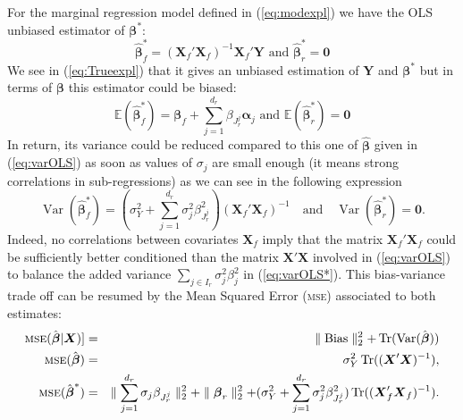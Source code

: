 \documentclass[12pt,a4paper]{report}
\begin{document}
For the marginal regression model defined in (\ref{eq:modexpl})
we have the \textsc{OLS} unbiased estimator of $\boldsymbol{\beta}^*$: 
		\begin{equation}
			\hat{\boldsymbol{\beta}}_{f}^* = (\boldsymbol{X}_{f}'\boldsymbol{X}_{f})^{-1}\boldsymbol{X}_{f}'\boldsymbol{Y}  \textrm{ and }\boldsymbol{\hat\beta}_{r}^* = \boldsymbol{0}
		\end{equation}
		We see in (\ref{eq:Trueexpl}) that it gives an unbiased estimation of $\boldsymbol{Y}$ and $\boldsymbol{\beta^*}$
		but in terms of $\boldsymbol{\beta}$ this estimator could be biased:
		\begin{equation}
			\mathbb{E}(\hat{\boldsymbol{\beta}}_{f}^*)=\boldsymbol{\beta}_{f}+\sum_{j =1}^{d_r}\beta_{J_r^j}\boldsymbol{\alpha}_j \textrm{ and }\mathbb{E}(\hat{\boldsymbol{\beta}}_{r}^*)=\boldsymbol{0}
		\end{equation}
		In return, its variance could be reduced compared to this one of $\hat{\boldsymbol{\beta}}$ given in (\ref{eq:varOLS}) as soon as values of $\sigma_j$ are small enough (it means strong correlations in sub-regressions) as we can see in the following expression
		\begin{equation}
			\operatorname{Var}(\hat{\boldsymbol{\beta}}_f^*)= (\sigma^2_Y+\sum_{j =1}^{d_r}\sigma^2_{j}\beta_{J_r^j}^2)(\boldsymbol{X}_f' \boldsymbol{X}_f)^{-1} \quad \textrm{and} \quad\operatorname{Var}(\hat{\boldsymbol{\beta}}_r^*)= \boldsymbol{0}. \label{eq:varOLS*}
		\end{equation}
Indeed, no correlations between covariates $\boldsymbol{X}_f$ imply that the matrix $\boldsymbol{X}_f' \boldsymbol{X}_f$ could be sufficiently better conditioned than the matrix $\boldsymbol{X}' \boldsymbol{X}$ involved in (\ref{eq:varOLS}) to balance the added variance $\sum_{j \in I_r}\sigma^2_{j}\beta_{j}^2$ in (\ref{eq:varOLS*}). This bias-variance trade off can be resumed by the Mean Squared Error (\textsc{mse}) associated to both estimates:
	\begin{eqnarray}
	\textsc{mse}(\hat{\boldsymbol{\beta}}|\boldsymbol{X})]&=&\parallel \operatorname{Bias}\parallel_2^2+\operatorname{Tr}(\operatorname{Var}(\hat{\boldsymbol{\beta}})) \\
			\textsc{mse}(\hat{\boldsymbol{\beta}})&=& \sigma_Y^2 \operatorname{Tr}((\boldsymbol{X}'\boldsymbol{X})^{-1}),
			 \\
			\textsc{mse}(\hat{\boldsymbol{\beta}}^*)&=& \parallel\sum_{j =1}^{d_r}\sigma_{j}\beta_{J_r^j} \parallel_2^2 +\parallel \boldsymbol{\beta}_r\parallel^2_2 + (\sigma^2_Y+\sum_{j =1}^{d_r}\sigma^2_{j}\beta_{J_r^j}^2 ) \operatorname{Tr}((\boldsymbol{X}_f' \boldsymbol{X}_f)^{-1}).
	\end{eqnarray}	 
 				  
\end{document}
